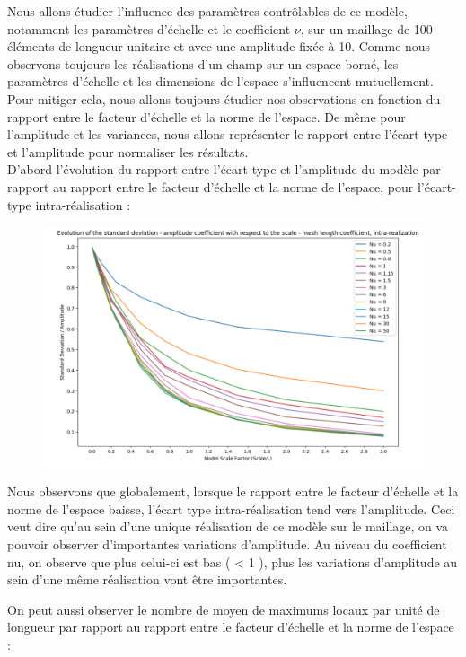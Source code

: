 \documentclass[a4paper,10pt]{article}
\begin{document}
	Nous allons  étudier l'influence des paramètres contrôlables de ce modèle, notamment les paramètres d'échelle et le coefficient $\nu$, sur un maillage de 100 éléments de longueur unitaire et avec une amplitude fixée à 10. 
	Comme nous observons toujours les réalisations d'un champ sur un espace borné, les paramètres d'échelle et les dimensions de l'espace s'influencent mutuellement. Pour mitiger cela, nous allons toujours étudier nos observations en fonction du rapport entre le facteur d'échelle et la norme de l'espace. De même pour l'amplitude et les variances, nous allons représenter le rapport entre l'écart type et l'amplitude pour normaliser les résultats. \\
	
	D'abord l'évolution du rapport entre l'écart-type et l'amplitude du modèle par rapport au rapport entre le facteur d'échelle et la norme de l'espace, pour l'écart-type intra-réalisation : 
	
\begin{figure}[H]
   \centering   
   \noindent \includegraphics[width = \linewidth]{stdDevIntra.png}
      \caption{}
         \label{stdDevIntra}
\end{figure}
	
	Nous observons que globalement, lorsque le rapport entre le facteur d'échelle et la norme de l'espace baisse, l'écart type intra-réalisation tend vers l'amplitude. Ceci veut dire qu'au sein d'une unique réalisation de ce modèle sur le maillage, on va pouvoir observer d'importantes variations d'amplitude.
	Au niveau du coefficient nu, on observe que plus celui-ci est bas ( < 1 ), plus les variations d'amplitude au sein d'une même réalisation vont être importantes. 
	
	On peut aussi observer le nombre de moyen de maximums locaux par unité de longueur par rapport au rapport entre le facteur d'échelle et la norme de l'espace : 
	
\end{document}
